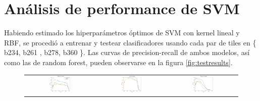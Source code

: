 \section {Análisis de performance de SVM}

Habiendo estimado los hiperparámetros óptimos de SVM con kernel lineal y RBF, se procedió a entrenar y testear clasificadores usando cada par de tiles en \{ b234, b261 , b278, b360 \}. Las curvas de precision-recall de ambos modelos, así como las de random forest, pueden observarse en la figura \ref{fig:testresults}. \\

\begin{figure}[h!]
\begin{center}

\begin{tabular}{ccc}
\includegraphics[width=0.32\textwidth]{Kap3/test_results_train=b278Test=b234.png} &
\includegraphics[width=0.32\textwidth]{Kap3/test_results_train=b278Test=b261.png} &
\includegraphics[width=0.32\textwidth]{Kap3/test_results_train=b278Test=b360.png} \\


\end{tabular}
\end{center}
\end{figure}
